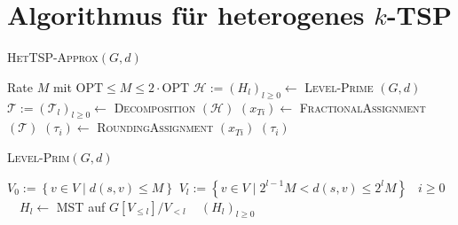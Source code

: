 \documentclass[a4paper,ngerman,12pt,bibtotoc]{scrartcl}
\newcommand{\LineFor}[2]{\State\algorithmicfor\ {#1}\ \algorithmicdo\ {#2} \algorithmicend\ \algorithmicfor}
\theoremstyle{definition}
\theoremstyle{plain}
\theoremstyle{remark}
\newcommand{\Hc}{\mathcal{H}}
\newcommand{\Tc}{\mathcal{T}}
\newcommand{\OPT}{\mathrm{OPT}}
\begin{document}
	\hrulefill
			
	{
		\renewcommand{\section}[2]{}
		\renewcommand*{\bibfont}{\tiny}
		\nocite{*}
		\printbibliography		
	}		
		
	\section*{Algorithmus für heterogenes $k$-TSP}\footnotesize
	
	\begin{minipage}{0.5\textwidth}
		\begin{algorithm}[H]\footnotesize
			\caption{\small \textsc{HetTSP-Approx}$(G, d)$}\label{AlgHetTSP}
			\begin{algorithmic}[1]
				\State Rate $M$ mit $\OPT \leq M \leq 2\cdot\OPT$
				\State $\Hc := \left(H_l\right)_{l\geq 0} \gets$ \textsc{Level-Prime} $\left(G, d\right)$
				\State $\Tc := \left(\Tc_l\right)_{l\geq 0} \gets$ \textsc{Decomposition} $\left(\Hc\right)$
				\State $\left(x_{Ti}\right) \gets$ \textsc{FractionalAssignment}  $\left(\Tc\right)$
				\State $\left(\tau_i\right) \gets$ \textsc{RoundingAssignment} $\left(x_{Ti}\right)$
				\State \Return $\left(\tau_i\right)$
			\end{algorithmic}
		\end{algorithm}
		
		\begin{algorithm}[H]\footnotesize
			\caption{\small\textsc{Level-Prim}$(G, d)$}\label{AlgLevelPrim}
			\begin{algorithmic}[1]
				\State $V_0 := \left\lbrace v\in V \mid d(s,v) \leq M\right\rbrace$
				\State $V_l := \left\lbrace v \in V \mid 2^{l-1}M < d(s,v) \leq 2^l M\right\rbrace$
				\LineFor{$i\geq 0$}{$H_l \gets$ MST auf $G\left[V_{\leq l}\right]/V_{<l}$}
				\State \Return $\left(H_l\right)_{l\geq 0}$
			\end{algorithmic}
		\end{algorithm}	
		

\end{minipage}
\end{document}
